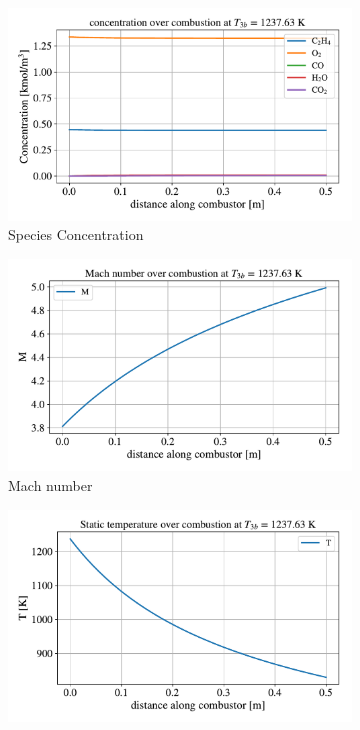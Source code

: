 \documentclass[a4paper]{article}
\begin{document}
\begin{figure}[H]
    \centering
    \begin{subfigure}[h]{0.49\linewidth}
        \includegraphics[width=\linewidth]{part_2_img/concentration_1238.pdf}
        \caption{Species Concentration}
        \label{subfig:concentration_1238}
    \end{subfigure}
    \begin{subfigure}[h]{0.49\linewidth}
        \includegraphics[width=\linewidth]{part_2_img/mach_1238.pdf}
        \caption{Mach number}
        \label{subfig:mach_1238}
    \end{subfigure}
    \begin{subfigure}[h]{0.49\linewidth}
        \includegraphics[width=\linewidth]{part_2_img/static_temp_1238.pdf}

\end{subfigure}
\end{figure}
\end{document}
